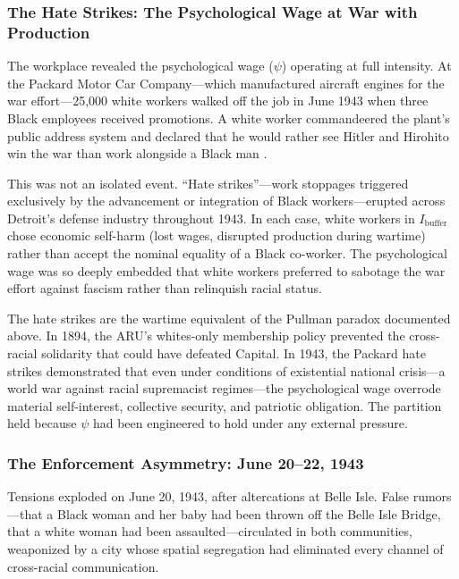 \documentclass[12pt,openany]{book}
\begin{document}
\subsubsection{The Hate Strikes: The Psychological Wage at War with Production}

The workplace revealed the psychological wage ($\psi$) operating at full intensity. At the Packard Motor Car Company---which manufactured aircraft engines for the war effort---25,000 white workers walked off the job in June 1943 when three Black employees received promotions. A white worker commandeered the plant's public address system and declared that he would rather see Hitler and Hirohito win the war than work alongside a Black man \cite{capeci_detroit}.

This was not an isolated event. ``Hate strikes''---work stoppages triggered exclusively by the advancement or integration of Black workers---erupted across Detroit's defense industry throughout 1943. In each case, white workers in $I_{\text{buffer}}$ chose economic self-harm (lost wages, disrupted production during wartime) rather than accept the nominal equality of a Black co-worker. The psychological wage was so deeply embedded that white workers preferred to sabotage the war effort against fascism rather than relinquish racial status.

The hate strikes are the wartime equivalent of the Pullman paradox documented above. In 1894, the ARU's whites-only membership policy prevented the cross-racial solidarity that could have defeated Capital. In 1943, the Packard hate strikes demonstrated that even under conditions of existential national crisis---a world war against racial supremacist regimes---the psychological wage overrode material self-interest, collective security, and patriotic obligation. The partition held because $\psi$ had been engineered to hold under any external pressure.

\subsubsection{The Enforcement Asymmetry: June 20--22, 1943}

Tensions exploded on June 20, 1943, after altercations at Belle Isle. False rumors---that a Black woman and her baby had been thrown off the Belle Isle Bridge, that a white woman had been assaulted---circulated in both communities, weaponized by a city whose spatial segregation had eliminated every channel of cross-racial communication.
\end{document}
